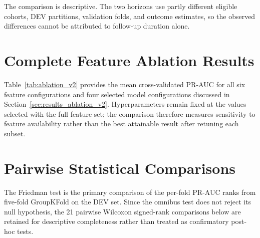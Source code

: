 The comparison is descriptive. The two horizons use partly different eligible cohorts, DEV partitions, validation folds, and outcome estimates, so the observed differences cannot be attributed to follow-up duration alone.


\section{Complete Feature Ablation Results}
\label{app:ablation}

Table~\ref{tab:ablation_v2} provides the mean cross-validated PR-AUC for all six feature configurations and four selected model configurations discussed in Section~\ref{sec:results_ablation_v2}. Hyperparameters remain fixed at the values selected with the full feature set; the comparison therefore measures sensitivity to feature availability rather than the best attainable result after retuning each subset.




\section{Pairwise Statistical Comparisons}
\label{app:stats}

The Friedman test is the primary comparison of the per-fold PR-AUC ranks from five-fold GroupKFold on the DEV set. Since the omnibus test does not reject its null hypothesis, the 21 pairwise Wilcoxon signed-rank comparisons below are retained for descriptive completeness rather than treated as confirmatory post-hoc tests.

